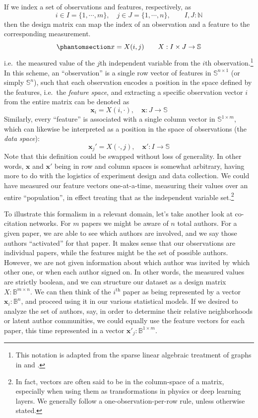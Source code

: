 \documentclass[%
	12pt,
		oneside,
		letterpaper
]{book}
\begin{document}
If we index a set of observations and features, respectively, as
\[ i\in I=\{1,\cdots,m\}, \quad j\in J=\{1,\cdots,n\},\qquad I,J:\mathbb{N}\]
then the design matrix can map the index of an observation and a feature
to the corresponding measurement.
\begin{equation}\phantomsection\label{eq-design-mat}{
x=X(i,j)\qquad X : I\times J \rightarrow \mathbb{S}
}\end{equation} i.e.~the measured value of the \(j\)th independent
variable from the \(i\)th observation.\footnote{ This notation is
  adapted from the sparse linear algebraic treatment of graphs in
  \textcite{GraphAlgorithmsLanguage_Kepner2011} and
  \textcite{MathematicalfoundationsGraphBLAS_Kepner2016}.} In this
scheme, an ``observation'' is a single row vector of features in
\(\mathbb{S}^{n\times 1}\) (or simply \(\mathbb{S}^{n}\)), such that
each observation encodes a position in the space defined by the
features, i.e.~the \emph{feature space}, and extracting a specific
observation vector \(i\) from the entire matrix can be denoted as
\[\mathbf{x}_i=X(i,\cdot),\quad \mathbf{x}:J\rightarrow\mathbb{S}\]
Similarly, every ``feature'' is associated with a single column vector
in \(\mathbb{S}^{1\times m}\), which can likewise be interpreted as a
position in the space of observations (the \emph{data space}):
\[\mathbf{x}_j'=X(\cdot,j),\quad \mathbf{x}':I\rightarrow\mathbb{S}\]
Note that this definition could be swapped without loss of generality.
In other words, \(\mathbf{x}\) and \(\mathbf{x}'\) being in row and
column spaces is somewhat arbitrary, having more to do with the
logistics of experiment design and data collection. We could have
measured our feature vectors one-at-a-time, measuring their values over
an entire ``population'', in effect treating that as the independent
variable set.\footnote{ In fact, vectors are often said to be in the
  column-space of a matrix, especially when using them as
  transformations in physics or deep learning layers. We generally
  follow a one-observation-per-row rule, unless otherwise stated.}

To illustrate this formalism in a relevant domain, let's take another
look at co-citation networks. For \(m\) papers we might be aware of
\(n\) total authors. For a given paper, we are able to see which authors
are involved, and we say those authors ``activated'' for that paper. It
makes sense that our observations are individual papers, while the
features might be the set of possible authors. However, we are not given
information about which author was invited by which other one, or when
each author signed on. In other words, the measured values are strictly
boolean, and we can structure our dataset as a design matrix
\(X:\mathbb{B}^{m\times n}\). We can then think of the
\(i^{\mathrm{th}}\) paper as being represented by a vector
\(\mathbf{x}_i:\mathbb{B}^n\), and proceed using it in our various
statistical models. If we desired to analyze the set of authors, say, in
order to determine their relative neighborhoods or latent author
communities, we could equally use the feature vectors for each paper,
this time represented in a vector
\(\mathbf{x}'_j:\mathbb{B}^{1\times m}\).
\end{document}

